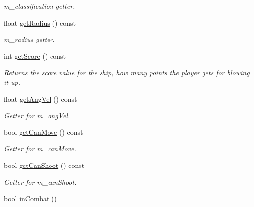 \begin{DoxyCompactItemize}
\begin{DoxyCompactList}\small\item\em m\-\_\-classification getter. \end{DoxyCompactList}\item 
\hypertarget{classship_ab247165c9c55d122195cd4edec0d823d}{float \hyperlink{classship_ab247165c9c55d122195cd4edec0d823d}{get\-Radius} () const }\label{classship_ab247165c9c55d122195cd4edec0d823d}

\begin{DoxyCompactList}\small\item\em m\-\_\-radius getter. \end{DoxyCompactList}\item 
\hypertarget{classship_a905701667792667dd63e676e97864c15}{int \hyperlink{classship_a905701667792667dd63e676e97864c15}{get\-Score} () const }\label{classship_a905701667792667dd63e676e97864c15}

\begin{DoxyCompactList}\small\item\em Returns the score value for the ship, how many points the player gets for blowing it up. \end{DoxyCompactList}\item 
\hypertarget{classship_ab752c545e9f8a22fecff63dc77c3a5a9}{float \hyperlink{classship_ab752c545e9f8a22fecff63dc77c3a5a9}{get\-Ang\-Vel} () const }\label{classship_ab752c545e9f8a22fecff63dc77c3a5a9}

\begin{DoxyCompactList}\small\item\em Getter for m\-\_\-ang\-Vel. \end{DoxyCompactList}\item 
\hypertarget{classship_ae4232335b58866673ca45bb42e35c2a2}{bool \hyperlink{classship_ae4232335b58866673ca45bb42e35c2a2}{get\-Can\-Move} () const }\label{classship_ae4232335b58866673ca45bb42e35c2a2}

\begin{DoxyCompactList}\small\item\em Getter for m\-\_\-can\-Move. \end{DoxyCompactList}\item 
\hypertarget{classship_abe8c5d20cef002bb0013a33253cff7c4}{bool \hyperlink{classship_abe8c5d20cef002bb0013a33253cff7c4}{get\-Can\-Shoot} () const }\label{classship_abe8c5d20cef002bb0013a33253cff7c4}

\begin{DoxyCompactList}\small\item\em Getter for m\-\_\-can\-Shoot. \end{DoxyCompactList}\item 
\hypertarget{classship_ad86c5ef782779451e8539c44b9a23123}{bool \hyperlink{classship_ad86c5ef782779451e8539c44b9a23123}{in\-Combat} ()}\label{classship_ad86c5ef782779451e8539c44b9a23123}


\end{DoxyCompactItemize}
